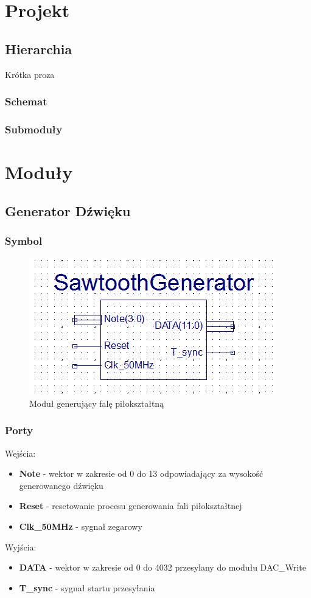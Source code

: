 \documentclass[a4paper]{report}
\begin{document}
\chapter{Projekt}
	\section{Hierarchia}
	Krótka proza
		\subsection{Schemat}
		\subsection{Submoduły}
\chapter{Moduły}
	\section{Generator Dźwięku}
		\subsection{Symbol}
			\begin{figure}[h!]
				\centering
				\includegraphics{sawtoothgenerator2.png}
				\caption{Moduł generujący falę piłokształtną}
			\end{figure}
		\subsection{Porty}
		{\Large Wejścia:}
			\begin{itemize}	 
				\item \textbf{Note} - wektor w zakresie od 0 do 13 odpowiadający za wysokość generowanego dźwięku
				\item \textbf{Reset} - resetowanie procesu generowania fali piłokształtnej
				\item \textbf{Clk\_50MHz} - sygnał zegarowy
			\end{itemize}
		{\Large Wyjścia:}
			\begin{itemize} 
				\item \textbf{DATA} - wektor w zakresie od 0 do 4032 przesylany do modułu DAC\_Write
				\item \textbf{T\_sync} - sygnał startu przesyłania
			\end{itemize}
\end{document}
